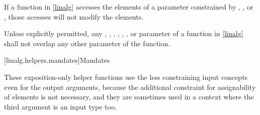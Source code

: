 \pnum
If a function in \ref{linalg} accesses the elements
of a parameter constrained by
,
, or
,
those accesses will not modify the elements.

\pnum
Unless explicitly permitted, any
,
,
,
,
,
, or
parameter of a function in \ref{linalg}
shall not overlap any other  parameter of the function.

[linalg.helpers.mandates]{Mandates}

\pnum
\begin{note}
These exposition-only helper functions use
the less constraining input concepts even for the output arguments,
because the additional constraint for assignability of elements
is not necessary, and
they are sometimes used in a context
where the third argument is an input type too.
\end{note}

